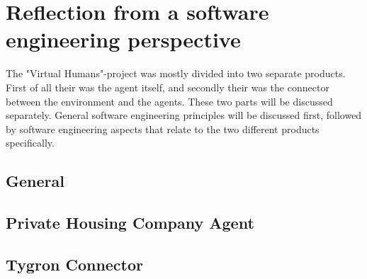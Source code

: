 \section{Reflection from a software engineering perspective}
\label{sec:Reflection from a software engineering perspective}

The "Virtual Humans"-project was mostly divided into two separate products.
First of all their was the agent itself, and secondly their was the connector between the environment and the agents.
These two parts will be discussed separately. General software engineering principles will be  discussed first,
followed by software engineering aspects that relate to the two different products specifically.

\subsection{General}
\label{sub:General}



\subsection{Private Housing Company Agent}
\label{sub:Private Housing Company Agent}


\subsection{Tygron Connector}
\label{sub:Tygron Connector}


\newpage

